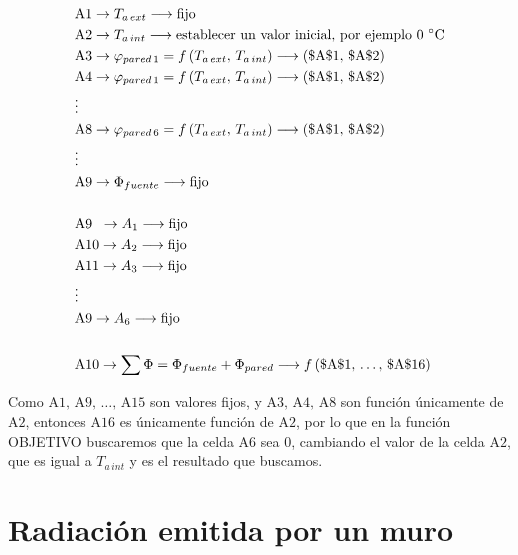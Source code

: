 \documentclass[11pt]{article}
\begin{document}
\[ \begin{aligned}
    & \mathrm{A} 1 \rightarrow T_{ a \, ext } \longrightarrow \text{fijo} \\
    & \mathrm{A} 2 \rightarrow T_{ a \, int } \longrightarrow \text{establecer un valor inicial, por ejemplo 0 \degree C} \\
    & \mathrm{A} 3 \rightarrow \varphi _{ pared \, 1 } = f \left( T_{ a \, ext }, \, T_{ a \, int } \right) \longrightarrow  \left( \$ \mathrm{A} \$ 1, \, \$ \mathrm{A} \$ 2 \right) \\
    & \mathrm{A} 4 \rightarrow \varphi _{ pared \, 1 } = f \left( T_{ a \, ext }, \, T_{ a \, int } \right) \longrightarrow  \left( \$ \mathrm{A} \$ 1, \, \$ \mathrm{A} \$ 2 \right) \\
    & \vdots \\
    & \mathrm{A} 8 \rightarrow \varphi _{ pared \, 6 } = f \left( T_{ a \, ext }, \, T_{ a \, int } \right) \longrightarrow  \left( \$ \mathrm{A} \$ 1, \, \$ \mathrm{A} \$ 2 \right) \\
    & \vdots \\
    & \mathrm{A} 9 \rightarrow \Phi _{ fuente } \longrightarrow \text{fijo} \\
    & \\
    & \mathrm{A} 9 \;\;  \rightarrow A_1 \longrightarrow \text{fijo} \\
    & \mathrm{A} 10   \rightarrow A_2 \longrightarrow \text{fijo} \\
    & \mathrm{A} 11   \rightarrow A_3 \longrightarrow \text{fijo} \\
    & \vdots \\
    & \mathrm{A} 9 \rightarrow A_6 \longrightarrow \text{fijo} \\
    & \\
    &\mathrm{A} 10 \rightarrow \sum{ \Phi } = \Phi _{ fuente } + \Phi _{ pared } \longrightarrow f \left( \$ \mathrm{A} \$ 1, \, \ldots , \, \$ \mathrm{A} \$ 16 \right)
\end{aligned} \]

Como $ \mathrm{A} 1, \, \mathrm{A} 9, \, \ldots, \, \mathrm{A} 15 $ son valores fijos, y $ \mathrm{A} 3, \, \mathrm{A} 4, \, \mathrm{A} 8 $ son función únicamente de $ \mathrm{A} 2 $, entonces $ \mathrm{A} 16 $ es únicamente función de $ \mathrm{A} 2 $, por lo que en la función OBJETIVO buscaremos que la celda $ \mathrm{A} 6 $ sea 0, cambiando el valor de la celda $ \mathrm{A} 2 $, que es igual a $ T_{ a \, int } $ y es el resultado que buscamos.

\section{Radiación emitida por un muro}
\end{document}
